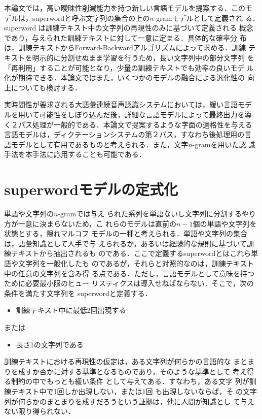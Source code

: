 本論文では，高い曖昧性削減能力を持つ新しい言語モデルを提案する．このモ
デルは，superwordと呼ぶ文字列の集合の上の$n$-gramモデルとして定義され
る．superword は訓練テキスト中の文字列の再現性のみに基づいて定義される
概念であり，与えられた訓練テキストに対して一意に定まる．具体的な確率分
布は，訓練テキストからForward-Backwardアルゴリズムによって求める．訓練
テキストを明示的に分割せぬまま学習を行うため，長い文字列中の部分文字列
を「再利用」することが可能となり，少量の訓練テキストでも効率の良いモデ
ル化が期待できる．本論文ではまた，いくつかのモデルの融合による汎化性の
向上についても検討する．

実時間性が要求される大語彙連続音声認識システムにおいては，緩い言語モデ
ルを用いて\mbox{可能性をしぼり込んだ後，詳細な言語モデルによって最終出力を導}
く２パス処理が一般的である．本論文で提案するような字面の適格性を与える
言語モデルは，ディクテーションシステムの第２パス，すなわち後処理用の言
語モデルとして有用であるものと考えられる．また，文字$n$-gramを用いた認
識手法\cite{yamada94}を本手法に応用することも可能である．
\section{superwordモデルの定式化}
単語\cite{mori96a}や文字列の$n$-gram\cite{aito96}では与え
られた系列を単語ないし文字列に分割するやり方が一意に決まらないため，こ
れらのモデルは直前の\(n-1\)個の単語や文字列を状態とする，隠れマルコフ
モデルの一種と考えられる．単語や文字列の集合は，語彙知識として人手で与
えられるか，あるいは経験的な規則に基づいて訓練テキストから抽出されるも
のである．ここで定義するsuperwordとはこれら単語や文字列を一般化したも
のであるが，それらと対照的なのは，訓練テキスト中の任意の文字列を含み得
る点である．ただし，言語モデルとして意味を持つために必要最小限のヒュー
リスティクスは導入せねばならない．そこで，次の条件を満たす文字列を
superwordと定義する．
\begin{itemize}
\item 訓練テキスト中に最低2回出現する
\end{itemize}
または
\begin{itemize}
\item 長さ1の文字列である
\end{itemize}
訓練テキストにおける再現性の仮定は，ある文字列が何らかの言語的な
まとまりを成すか否かに対する基準となるものであり，そのような基準として
考え得る制約の中でもっとも緩い条件\break
として与えてある．すなわち，ある文字
列が訓練テキスト中で1回しか出現しない，または1回\break
も出現しないならば，そ
の文字列が何らかのまとまりを成すだろうという証拠は，他に人間が知識とし
て与えない限り得られない．

